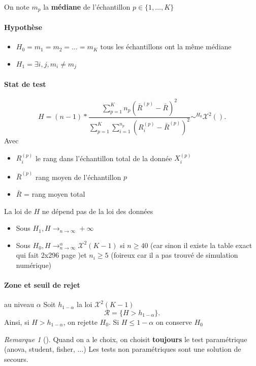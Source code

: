 \documentclass{article}
\theoremstyle{plain}%
\theoremstyle{definition}
\theoremstyle{remark}
\newtheorem*{rem}{Remarque}
\begin{document}
On note $ m_p $ la \textbf{médiane} de l'échantillon $ p \in \{1, \dots, K\} $ 

\paragraph*{Hypothèse} \begin{itemize}
    \item $ H_0 = m_1 = m_2 = \dots = m_K $ tous les échantillons ont la même médiane
    \item $ H_1 = \exists i,j, m_i \neq m_j $ 
\end{itemize}

\paragraph*{Stat de test}
\[
    H = ( n-1 ) * \frac{ \sum_{p=1}^{K} n_p (\bar{R} ^{(p)} - \bar{R} )^2}{\sum_{p=1}^{K} \sum_{i=1}^{n_p} (R_i^{(p)} - \bar{R}^{(p)})^2 } \sim^{H_0} \mathcal{X}^2()
.\]
Avec \begin{itemize}
    \item $ R_i^{(p)} $ le rang dans l'échantillon total de la donnée $ X_i^{(p)} $ 
    \item $ \bar{R}^{(p)} $ rang moyen de l'échantillon $ p $ 
    \item $ \bar{R} $ = rang moyen total
\end{itemize}

La loi de $ H $ ne dépend pas de la loi des données
\begin{itemize}
    \item Sous $ H_1, H \to_{n \to \infty } +\infty  $ 
    \item Sous $ H_0, H \to _{n \to \infty}^{\alpha } \mathcal{X}^2(K-1) $ si $ n \geq 40 $ (car sinon il existe la table exact qui fait 2x296 page )et $ n_i \geq 5 $ (foireux car il a pas trouvé de simulation numérique)
\end{itemize}

\paragraph*{Zone et seuil de rejet} au niveau $ \alpha  $ Soit $ h_{1 - \alpha } $ la loi $ \mathcal{X}^2(K-1) $ 
\[
    \mathcal{R} = \{H > h_{1 - \alpha }\}
.\]
Ainsi, si $ H > h_{1 - \alpha } $, on rejette $ H_0 $. Si $ H \leq 1 - \alpha  $ on conserve $ H_0 $ 

\begin{rem}[]
    Quand on a le choix, on choisit \textbf{toujours} le test paramétrique (anova, student, fisher, ...) Les tests non paramétriques sont une solution de secours.
\end{rem}
\end{document}

